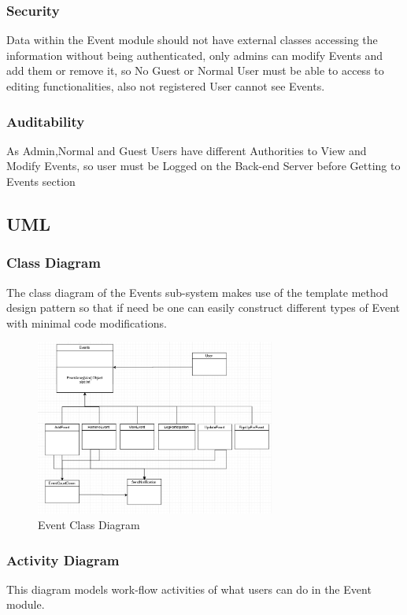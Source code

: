 \subsubsection{Security}
Data within the Event module should not have external classes accessing the information without being authenticated, only admins can modify Events and add them or remove it, so No Guest or Normal User must be able to access to editing functionalities, also not registered User cannot see Events.

\subsubsection{Auditability}
As Admin,Normal and Guest Users have different Authorities to View and Modify Events, so user must be Logged on the Back-end Server before Getting to Events section

\pagebreak
\subsection{UML}
\subsubsection{Class Diagram}
The class diagram of the Events sub-system makes use of the template method design pattern so that if need be one can easily construct different types of Event with minimal code modifications.

\begin{figure}[H]
	\centering
	\includegraphics[width=0.7\textwidth]{event/ClassDiagrams(NoMethods).PNG}
	\caption{Event Class Diagram}
\end{figure}



\pagebreak
\subsubsection{Activity Diagram}
This diagram models work-flow activities of what users can do in the Event module.

